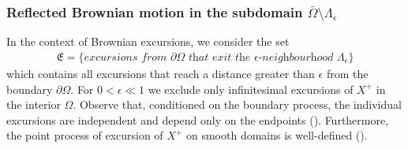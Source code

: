 \documentclass[11pt,a4paper]{article}
\begin{document}
\subsubsection{Reflected Brownian motion in the subdomain $\bar{\Omega} \setminus \Lambda_\epsilon$}
\label{sec:EXCsubDomain}
In the context of Brownian excursions, we consider the set 
\begin{align*}
\mathfrak{E} = \{ \textit{excursions from $\partial \Omega$ that exit the $\epsilon$-neighbourhood $\Lambda_\epsilon$}  \}
\end{align*}
which contains all excursions that reach a distance greater than $\epsilon$ from the boundary $\partial \Omega$. For $0<\epsilon \ll 1$ we exclude only infinitesimal excursions of $X^+$ in the interior $\Omega$. Observe that, conditioned on the boundary process, the individual excursions are independent and depend only on the endpoints (\cite{Jacobs78}). Furthermore, the point process of excursion of $X^+$ on smooth domains is well-defined (\cite{HSU86}). 
\end{document}
